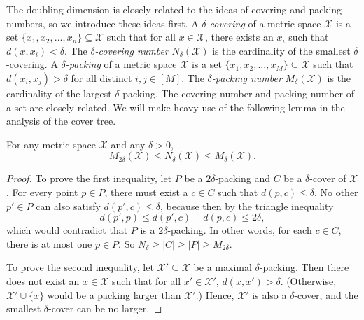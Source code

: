 \documentclass[../main.tex]{subfiles}
\newcommand{\set}[1]{\mathcal {#1}}
\newcommand{\dist}[2]{\distf({#1},{#2})}
\newcommand{\distf}{d}
\begin{document}
The doubling dimension is closely related to the ideas of covering and packing numbers,
so we introduce these ideas first.
A \emph{$\delta$-covering} of a metric space $\set X$ is a set $\{x_1,x_2,...,x_n\} \subseteq \set X$ such that for all $x\in\set X$, there exists an $x_i$ such that $\dist{x}{x_i} < \delta$.
The \emph{$\delta$-covering number} $N_\delta(\set X)$ is the cardinality of the smallest $\delta$-covering.
A \emph{$\delta$-packing} of a metric space $\set X$ is a set $\{x_1,x_2,...,x_M\} \subseteq \set X$ such that $\dist{x_i}{x_j} > \delta$ for all distinct $i,j\in[M]$.
The \emph{$\delta$-packing number} $M_\delta (\set X)$ is the cardinality of the largest $\delta$-packing.
The covering number and packing number of a set are closely related.
We will make heavy use of the following lemma in the analysis of the cover tree.

\begin{lemma}
    \label{lemma:coverpacking}
    For any metric space $\set X$ and any $\delta>0$,
    \begin{equation}
        M_{2\delta}(\set X) \le N_\delta(\set X) \le M_{\delta}(\set X)
        .
    \end{equation}
\end{lemma}
\begin{proof}
    To prove the first inequality, let $P$ be a $2\delta$-packing and $C$ be a $\delta$-cover of $\set X$.
    For every point $p\in P$, there must exist a $c\in C$ such that $\dist{p}{c}\le\delta$.
    No other $p'\in P$ can also satisfy $\dist{p'}{c}\le\delta$, because then by the triangle inequality
    \begin{equation}
        \dist{p'}{p} \le \dist{p'}{c}+\dist{p}{c} \le 2\delta
        ,
    \end{equation}
    which would contradict that $P$ is a $2\delta$-packing.
    In other words, for each $c\in C$, there is at most one $p\in P$.
    So $N_\delta \ge |C| \ge |P| \ge M_{2\delta}$.

    To prove the second inequality, let $\set X'\subseteq \set X$ be a maximal $\delta$-packing.
    Then there does not exist an $x\in\set X$ such that for all $x'\in\set X'$, 
    $\dist{x}{x'} > \delta$.
    (Otherwise, $\set X' \cup \{x\}$ would be a packing larger than $\set X'$.)
    Hence, $\set X'$ is also a $\delta$-cover,
    and the smallest $\delta$-cover can be no larger.
\end{proof}
\end{document}
